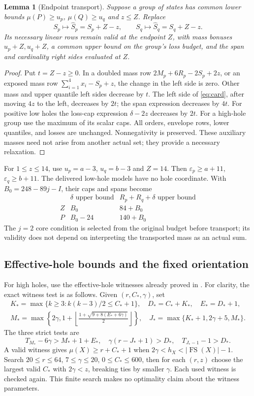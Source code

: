 \documentclass[11pt,a4paper]{article}
\newcommand{\FS}{\operatorname{FS}}
\newtheorem{lemma}[theorem]{Lemma}
\begin{document}
\begin{lemma}[Endpoint transport]\label{lem:transport}
Suppose a group of states has common lower bounds
$\mu(P)\ge u_p$, $\mu(Q)\ge u_q$ and $z\le Z$.
Replace
\[
 S_p\longmapsto\widehat S_p=S_p+Z-z,\qquad
 S_q\longmapsto\widehat S_q=S_q+Z-z.
\]
Its necessary linear rows remain valid at the endpoint $Z$, with mass
bonuses $u_p+Z,u_q+Z$, a common upper bound on the group's loss budget,
and the span and cardinality right sides evaluated at $Z$.
\end{lemma}
\begin{proof}
Put $t=Z-z\ge0$. In a doubled mass row
$2M_p+6R_p-2S_p+2z$, or an exposed mass row
$\sum_{i=1}^4x_i-S_p+z$, the change in the left side is zero.
Other mass and upper quantile left sides decrease by $t$.
The left side of \eqref{eq:card}, after moving $4z$ to the left,
decreases by $2t$; the span expression decreases by $4t$.
For positive low holes the loss-cap expression $\delta-2z$ decreases
by $2t$. For a high-hole group use the maximum of its scalar caps.
All orders, envelope rows, lower quantiles, and losses are unchanged.
Nonnegativity is preserved. These auxiliary masses need not arise from
another actual set; they provide a necessary relaxation.
\end{proof}
For $1\le z\le14$, use $u_p=a-3$, $u_q=b-3$ and $Z=14$.
Then $\varepsilon_p\ge a+11$, $\varepsilon_q\ge b+11$.
The delivered low-hole models have no hole coordinate. With
$B_0=248-89j-I$, their caps and spans become
\[
 \begin{array}{c|cc}
 &\delta\text{ upper bound}&R_p+R_q+\delta\text{ upper bound}\\\hline
 Z&B_0&84+B_0\\
 P&B_0-24&140+B_0
 \end{array}
\]
The $j=2$ core condition is selected from the original budget before
transport; its validity does not depend on interpreting the transported
mass as an actual sum.

\subsection{Effective-hole bounds and the fixed orientation}
For high holes, use the effective-hole witnesses already proved in
\cite{previous}. For clarity, the exact witness test is as follows.
Given $(r,C_*,\gamma)$, set
\begin{gather*}
 K_* =\max\{k\ge3:k(k-3)/2\le C_*+1\},\quad
 D_*=C_*+K_*,\quad E_*=D_*+1,\\
 M_* =\max\left\{2\gamma,1+\left\lfloor
 \frac{1+\sqrt{9+8(E_*+6\gamma)}}2\right\rfloor\right\},
 \quad J_* =\max\{K_*+1,2\gamma+5,M_*\}.
\end{gather*}
The three strict tests are
\[
 T_{M_*}-6\gamma>M_*+1+E_*,\quad
 \gamma(r-J_*+1)>D_*,\quad T_{J_*-1}-1>D_*.
\]
A valid witness gives $\mu(X)\ge r+C_*+1$ when
$2\gamma<h_X<|\FS(X)|-1$.
Search $20\le r\le64$, $7\le\gamma\le20$, $0\le C_*\le600$,
then for each $(r,z)$ choose the largest valid $C_*$ with $2\gamma<z$,
breaking ties by smaller $\gamma$. Each used witness is checked again.
This finite search makes no optimality claim about the witness parameters.
\end{document}

